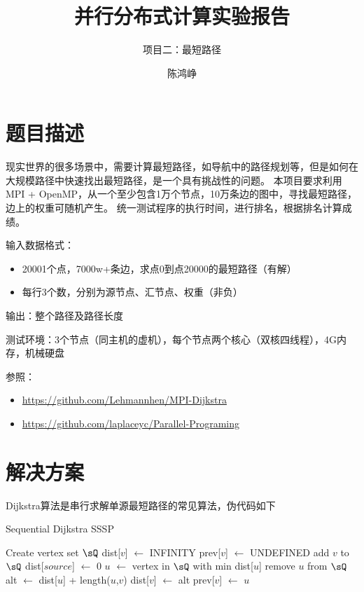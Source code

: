 \documentclass[reportComp]{thesis}
\title{并行分布式计算实验报告}
\subtitle{项目二：最短路径}
\author{陈鸿峥}
\begin{document}
\maketitle

\section{题目描述}
现实世界的很多场景中，需要计算最短路径，如导航中的路径规划等，但是如何在大规模路径中快速找出最短路径，是一个具有挑战性的问题。
本项目要求利用MPI + OpenMP，从一个至少包含1万个节点，10万条边的图中，寻找最短路径，边上的权重可随机产生。
统一测试程序的执行时间，进行排名，根据排名计算成绩。

输入数据格式：
\begin{itemize}
	\item 20001个点，7000w+条边，求点0到点20000的最短路径（有解）
	\item 每行3个数，分别为源节点、汇节点、权重（非负）
\end{itemize}

输出：整个路径及路径长度

测试环境：3个节点（同主机的虚机），每个节点两个核心（双核四线程），4G内存，机械硬盘

参照：
\begin{itemize}
\item \url{https://github.com/Lehmannhen/MPI-Dijkstra}
\item \url{https://github.com/laplaceyc/Parallel-Programing}
\end{itemize}

\section{解决方案}
Dijkstra算法是串行求解单源最短路径的常见算法，伪代码如下
\begin{algorithm}[H]
\caption{Sequential Dijkstra SSSP}
\label{alg:dijkstra}
\begin{algorithmic}[1]
\State Create vertex set $\sQ$
\State dist[$v$] $\gets$ INFINITY
\State prev[$v$] $\gets$ UNDEFINED
\State add $v$ to $\sQ$
\EndFor
\State dist[$source$] $\gets$ $0$
\State $u$ $\gets$ vertex in $\sQ$ with min dist[$u$]
\State remove $u$ from $\sQ$
\State alt $\gets$ dist[$u$] + length($u$,$v$)
\State dist[$v$] $\gets$ alt
\State prev[$v$] $\gets$ $u$
\EndIf
\EndFor
\EndWhile
\State{}
\EndProcedure
\end{algorithmic}
\end{algorithm}
\end{document}

